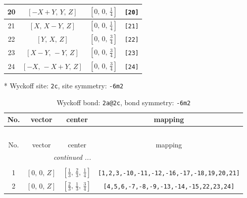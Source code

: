 \documentclass[fleqn,8pt]{jsarticle}
\begin{document}
\begin{longtable}{cccc}
20 & $\left[ - X + Y,\, Y,\, Z \right]$ & $\left[ 0,\, 0,\, \frac{1}{4} \right]$ & {\tt [20]} \\ \hline
21 & $\left[ X,\, X - Y,\, Z \right]$ & $\left[ 0,\, 0,\, \frac{1}{4} \right]$ & {\tt [21]} \\ \hline
22 & $\left[ Y,\, X,\, Z \right]$ & $\left[ 0,\, 0,\, \frac{3}{4} \right]$ & {\tt [22]} \\ \hline
23 & $\left[ X - Y,\, - Y,\, Z \right]$ & $\left[ 0,\, 0,\, \frac{3}{4} \right]$ & {\tt [23]} \\ \hline
24 & $\left[ - X,\, - X + Y,\, Z \right]$ & $\left[ 0,\, 0,\, \frac{3}{4} \right]$ & {\tt [24]} \\
\end{longtable}
* Wyckoff site: {\tt 2c}, site symmetry: {\tt -6m2}
\renewcommand{\arraystretch}{1.2}
\begin{longtable}{cccc}
\caption{Wyckoff bond: {\tt 2a@2c}, bond symmetry: {\tt -6m2}}
 \\
 \hline \hline
No. & vector & center & mapping \\ \hline \endfirsthead

\multicolumn{3}{l}{\tablename\ \thetable{}} \\
 \hline \hline
No. & vector & center & mapping \\ \hline \endhead

 \hline \hline
\multicolumn{3}{r}{\footnotesize\it continued ...} \\ \endfoot

 \hline \hline
\multicolumn{3}{r}{} \\ \endlastfoot

1 & $\left[ 0,\, 0,\, Z \right]$ & $\left[ \frac{1}{3},\, \frac{2}{3},\, \frac{1}{4} \right]$ & {\tt [1,2,3,-10,-11,-12,-16,-17,-18,19,20,21]} \\ \hline
2 & $\left[ 0,\, 0,\, Z \right]$ & $\left[ \frac{2}{3},\, \frac{1}{3},\, \frac{3}{4} \right]$ & {\tt [4,5,6,-7,-8,-9,-13,-14,-15,22,23,24]} \\
\end{longtable}
\renewcommand{\arraystretch}{1.2}
\end{document}
